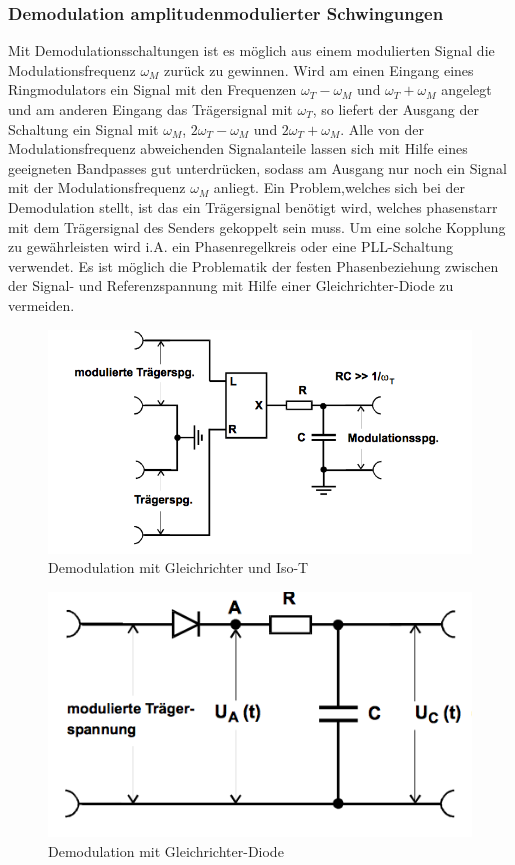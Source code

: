 \subsubsection{Demodulation amplitudenmodulierter Schwingungen}
Mit Demodulationsschaltungen ist es möglich aus einem modulierten Signal die Modulationsfrequenz $\omega_M$ zurück zu gewinnen.
Wird am einen Eingang eines Ringmodulators ein Signal mit den Frequenzen $\omega_T - \omega_M$ und $\omega_T + \omega_M$ angelegt und am anderen Eingang das Trägersignal mit $\omega_T$, so liefert der Ausgang der Schaltung ein Signal mit
$\omega_M$, $2\omega_T - \omega_M$ und $2\omega_T + \omega_M$. Alle von der Modulationsfrequenz abweichenden Signalanteile lassen sich mit Hilfe eines geeigneten Bandpasses gut unterdrücken, sodass am Ausgang nur noch ein Signal mit der Modulationsfrequenz $\omega_M$ anliegt. Ein Problem,welches sich bei der Demodulation stellt, ist das ein Trägersignal benötigt wird, welches phasenstarr mit dem Trägersignal des Senders gekoppelt sein muss. Um eine solche Kopplung zu gewährleisten wird i.A. ein Phasenregelkreis oder eine PLL-Schaltung verwendet.
Es ist möglich die Problematik der festen Phasenbeziehung zwischen der Signal- und Referenzspannung mit Hilfe einer Gleichrichter-Diode
zu vermeiden.

\begin{figure}
	\centering
	\includegraphics[width=\textwidth]{img/Abb8.png}
	\caption{Demodulation mit Gleichrichter und Iso-T \cite{FP}}
	\label{iso-t}
\end{figure}

\begin{figure}
	\centering
	\includegraphics[width=\textwidth]{img/Abb9.png}
	\caption{Demodulation mit Gleichrichter-Diode \cite{FP}}
	\label{fig:9}
\end{figure}

